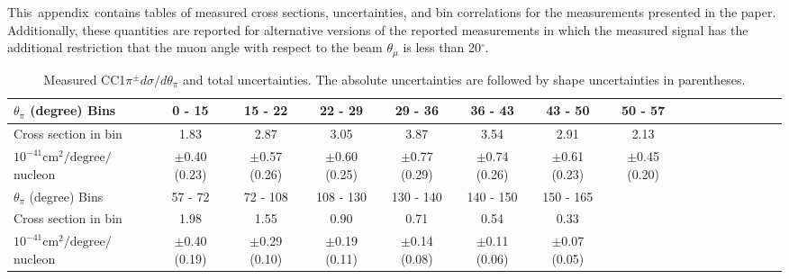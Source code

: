 \newcommand{\qsq}{\ensuremath{Q^2_{QE}}\xspace}
\renewcommand{\textfraction}{0.05}
\renewcommand{\topfraction}{0.95}
\renewcommand{\bottomfraction}{0.95}
\renewcommand{\floatpagefraction}{0.95}
\renewcommand{\dblfloatpagefraction}{0.95}
\renewcommand{\dbltopfraction}{0.95}
\setcounter{totalnumber}{5}
\setcounter{bottomnumber}{3}
\setcounter{topnumber}{3}
\setcounter{dbltopnumber}{3}

\renewcommand{\cconepi}{CC1\ensuremath{\pi^{\pm}}\xspace}
\renewcommand{\ccpi}{CCN\ensuremath{\pi^{\pm}}\xspace}
\renewcommand{\Tpi}{\ensuremath{T_{\pi}}\xspace}
\renewcommand{\thetapi}{\ensuremath{\theta_{\pi}}\xspace}

\ifdefined\PRLsupp
  \ifnum{}
    \newcommand{\SuppName}{appendix}
  \else
    \newcommand{\SuppName}{supplemental material}
  \fi
\else
  \newcommand{\SuppName}{supplemental material}
\fi

\appendix*
\section{}
This\ \SuppName\ contains tables of measured cross sections, uncertainties, and bin correlations for the measurements presented in the paper.  
Additionally, these quantities are reported for alternative versions of the reported measurements in which the measured signal has the 
additional restriction that the muon angle with respect to the beam $\theta_\mu$ is less than 20$^\circ$.



\begingroup
\squeezetable
\begin{table}[h]
\begin{tabular}{l|ccccccccccccccc}
\hline\hline
$\theta_{\pi}$ (degree) Bins & 0 - 15 & 15 - 22 & 22 - 29 & 29 - 36 & 36 - 43 & 43 - 50 & 50 - 57 \\ 
\hline
Cross section in bin & 1.83 & 2.87 & 3.05 & 3.87 & 3.54 & 2.91 & 2.13  \\ 
$10^{-41}\mathrm{cm}^2/\mathrm{degree}/$nucleon &  $\pm$0.40 (0.23) &  $\pm$0.57 (0.26) &  $\pm$0.60 (0.25) &  $\pm$0.77 (0.29) &  $\pm$0.74 (0.26) &  $\pm$0.61 (0.23) &  $\pm$0.45 (0.20) \\ 
\hline
$\theta_{\pi}$ (degree) Bins & 57 - 72 & 72 - 108 & 108 - 130 & 130 - 140 & 140 - 150 & 150 - 165 \\ 
\hline
Cross section in bin & 1.98 & 1.55 & 0.90 & 0.71 & 0.54 & 0.33 \\ 
$10^{-41}\mathrm{cm}^2/\mathrm{degree}/$nucleon &  $\pm$0.40 (0.19) &  $\pm$0.29 (0.10) &  $\pm$0.19 (0.11) &  $\pm$0.14 (0.08) &  $\pm$0.11 (0.06) &  $\pm$0.07 (0.05) \\ 
\hline\hline
\end{tabular}
\caption{Measured \cconepi $d\sigma / d\theta_\pi$ and total uncertainties.  The absolute uncertainties are followed by shape uncertainties in parentheses.}
\end{table}
\endgroup


